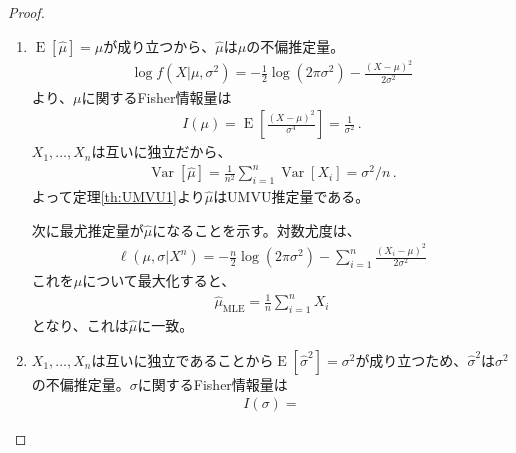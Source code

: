 \documentclass[11pt]{ltjsarticle}
\theoremstyle{definition}
\DeclareMathOperator{\E}{E}
\DeclareMathOperator{\Var}{Var}
\begin{document}
\begin{proof}
    \begin{enumerate}[(1)]
        \item $\E[\hat{\mu}]=\mu$が成り立つから、$\hat{\mu}$は$\mu$の不偏推定量。
        \begin{align}
            \log f(X|\mu,\sigma^2) = -\frac{1}{2}\log(2\pi\sigma^2) - \frac{(X-\mu)^2}{2\sigma^2}
        \end{align}
        より、$\mu$に関するFisher情報量は
        \begin{align}
            I(\mu) = \E\left[\frac{(X-\mu)^2}{\sigma^4}\right] = \frac{1}{\sigma^2}\, .
        \end{align}
        $X_1,\ldots,X_n$は互いに独立だから、
        \begin{align}
            \Var[\hat{\mu}] = \frac{1}{n^2}\sum_{i=1}^n\Var[X_i] = \sigma^2/n\, .
        \end{align}
        よって定理\ref{th:UMVU1}より$\hat{\mu}$はUMVU推定量である。

        次に最尤推定量が$\hat{\mu}$になることを示す。対数尤度は、
        \begin{align}
            \ell(\mu, \sigma | X^n) = -\frac{n}{2}\log(2\pi\sigma^2) - \sum_{i=1}^n\frac{(X_i-\mu)^2}{2\sigma^2}
        \end{align}
        これを$\mu$について最大化すると、
        \begin{align}
            \hat{\mu}_{\text{MLE}} = \frac{1}{n}\sum_{i=1}^n X_i
        \end{align}
        となり、これは$\hat{\mu}$に一致。

        \item $X_1,\ldots,X_n$は互いに独立であることから$\E[\hat{\sigma}^2]=\sigma^2$が成り立つため、$\hat{\sigma}^2$は$\sigma^2$の不偏推定量。$\sigma$に関するFisher情報量は
        \begin{align}
            I(\sigma) = 
        \end{align}
    \end{enumerate}
\end{proof}
\end{document}
